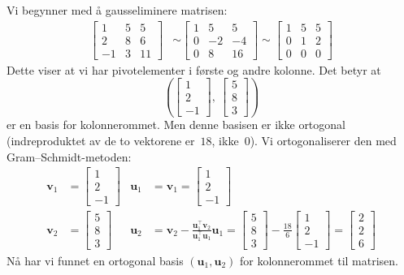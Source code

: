 \documentclass[notitlepage,a4paper,12pt,norsk]{IMFeksamen}
\newcommand{\roweq}{\sim}
\newcommand{\tr}{^\top}
\newcommand{\V}[1]{\mathbf{#1}}
\newcommand{\vvv}[3]{\begin{bmatrix} #1 \\ #2 \\ #3 \end{bmatrix}}
\renewcommand{\u}{\V{u}}
\renewcommand{\v}{\V{v}}
\newcommand{\0}{\V{0}}
\newcommand{\oppgslutt}{
\begin{center}
\pgfornament[width=6cm]{88}
\end{center}
}
\newenvironment{losning}{\begin{oppgave}}{\oppgslutt\end{oppgave}}
\begin{document}
\begin{losning}
Vi begynner med å gausseliminere matrisen:
\begin{align*}
\begin{bmatrix}
1 & 5 & 5 \\
2 & 8 & 6 \\
-1 & 3 & 11
\end{bmatrix}
&\roweq
\begin{bmatrix}
1 & 5 & 5 \\
0 & -2 & -4 \\
0 & 8 & 16
\end{bmatrix}
\roweq
\begin{bmatrix}
1 & 5 & 5 \\
0 & 1 & 2 \\
0 & 0 & 0
\end{bmatrix}
\end{align*}
Dette viser at vi har pivotelementer i første og andre kolonne.
Det betyr at
\[
\left( \vvv{1}{2}{-1}, \ \vvv{5}{8}{3} \right)
\]
er en basis for kolonnerommet.
Men denne basisen er ikke ortogonal
(indreproduktet av de to vektorene er~$18$, ikke~$0$).
Vi ortogonaliserer den med Gram--Schmidt-metoden:
\begin{align*}
\v_1 &= \vvv{1}{2}{-1} &
\u_1 &= \v_1 = \vvv{1}{2}{-1} \\
\v_2 &= \vvv{5}{8}{3} &
\u_2 &= \v_2 - \frac{\u_1\tr \v_2}{\u_1\tr \u_1} \u_1
      = \vvv{5}{8}{3} - \frac{18}{6} \vvv{1}{2}{-1}
      = \vvv{2}{2}{6}
\end{align*}
Nå har vi funnet en ortogonal basis $(\u_1, \u_2)$
for kolonnerommet til matrisen.
\end{losning}
\end{document}
